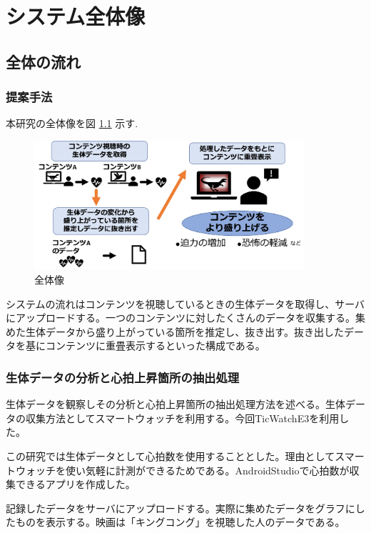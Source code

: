 \chapter{システム全体像}

\thispagestyle{myheadings}

\section{全体の流れ}

\subsection{提案手法}
本研究の全体像を図 \ref{zenntaizu} 示す.
\begin{figure}[H]
    \centering
    \includegraphics[width=10cm]{images/chapter3/zenntaizu.png}
    \caption{全体像}
    \label{zenntaizu}
\end{figure}
システムの流れはコンテンツを視聴しているときの生体データを取得し、サーバにアップロードする。一つのコンテンツに対したくさんのデータを収集する。集めた生体データから盛り上がっている箇所を推定し、抜き出す。抜き出したデータを基にコンテンツに重畳表示するといった構成である。


\subsection{生体データの分析と心拍上昇箇所の抽出処理}
生体データを観察しその分析と心拍上昇箇所の抽出処理方法を述べる。生体データの収集方法としてスマートウォッチを利用する。今回TicWatchE3を利用した。

この研究では生体データとして心拍数を使用することとした。理由としてスマートウォッチを使い気軽に計測ができるためである。AndroidStudioで心拍数が収集できるアプリを作成した。


記録したデータをサーバにアップロードする。実際に集めたデータをグラフにしたものを表示する。映画は「キングコング」を視聴した人のデータである。



